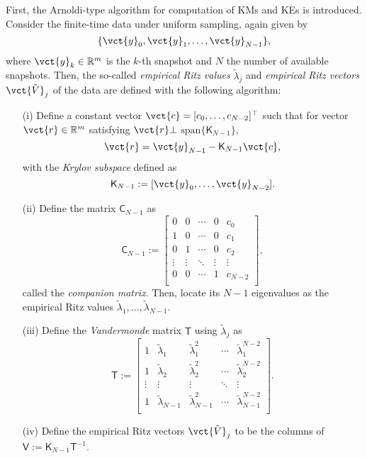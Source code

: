 \documentclass[a4paper,10pt]{article}
\def\bbR{{\mathbb{R}}}
\begin{document}
%
\vspace*{2mm}

First, the Arnoldi-type algorithm \cite{Rowley_JFM641} for computation of KMs and KEs is introduced.  
Consider the finite-time data under uniform sampling, again given by
\begin{equation}
\{\vct{y}_0,\vct{y}_1,\ldots,\vct{y}_{N-1}\},
\label{eqn:data_N}
\end{equation}
where $\vct{y}_k\in\bbR^m$ is the $k$-th snapshot and $N$ the number of available snapshots. 
Then, the so-called \emph{empirical Ritz values} $\tilde{\lambda}_j$ and \emph{empirical Ritz vectors} $\vct{\tilde{V}}_j$ of the data are defined with the following algorithm:
\begin{itemize}
\item[(i)] Define a constant vector $\vct{c}=[c_0,\ldots,c_{N-2}]^\top$ such that for vector $\vct{r}\in\bbR^m$ satisfying $\vct{r}\bot$ $\mathrm{span}\{\mathsf{K}_{N-1}\}$,
\begin{equation}
\vct{r}
=\vct{y}_{N-1}-\mathsf{K}_{N-1}\vct{c},
\label{eqn:c}
\end{equation}
with the \emph{Krylov subspace} defined as
\begin{equation}
\mathsf{K}_{N-1}:=[\vct{y}_0,\ldots,\vct{y}_{N-2}].
\label{eqn:K_N-1}
\end{equation}
%
\item[(ii)] Define the matrix $\mathsf{C}_{N-1}$ as
\[
\mathsf{C}_{N-1}:=
\left[
\begin{array}{ccccc}
0 & 0 & \cdots & 0 & c_0\\
1 & 0 & \cdots & 0 & c_1\\
0 & 1 & \cdots & 0 & c_2\\
\vdots & \vdots & \ddots & \vdots & \vdots\\
0 & 0 & \cdots & 1 & c_{N-2}\\
\end{array}
\right],
\]
called the \emph{companion matrix}.  
Then, locate its $N-1$ eigenvalues as the empirical Ritz values $\tilde{\lambda}_1,\ldots,\tilde{\lambda}_{N-1}$.  
%
\item[(iii)] Define the \emph{Vandermonde} matrix $\mathsf{T}$ using $\tilde{\lambda}_j$ as
\begin{equation}
\mathsf{T}:=
\left[
\begin{array}{ccccc}
1 & \tilde{\lambda}_1 & \tilde{\lambda}^2_1 & \cdots  & \tilde{\lambda}^{N-2}_1\\
1 & \tilde{\lambda}_2 & \tilde{\lambda}^2_2 & \cdots  & \tilde{\lambda}^{N-2}_2 \\
\vdots & \vdots & \vdots & \ddots & \vdots\\
1 & \tilde{\lambda}_{N-1} & \tilde{\lambda}^2_{N-1} & \cdots & \tilde{\lambda}^{N-2}_{N-1} \\
\end{array}
\right].
\end{equation}
%
\item[(iv)] Define the empirical Ritz vectors $\vct{\tilde{V}}_j$ to be the columns of $\mathsf{V}:=\mathsf{K}_{N-1}\mathsf{T}^{-1}$.  
\end{itemize}
\end{document}
